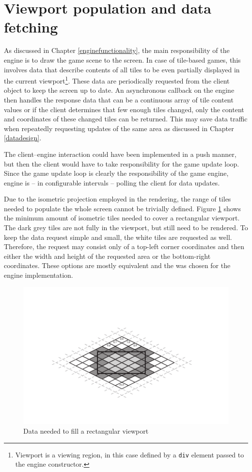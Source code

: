 \documentclass[11pt,oneside, final]{fithesis2}
\begin{document}
\section{Viewport population and data fetching}
As discussed in Chapter \ref{enginefunctionality}, the main responsibility of the engine is to draw the game scene to the screen. In case of tile-based games, this involves data that describe contents of all tiles to be even partially displayed in the current viewport\footnote{Viewport is a viewing region, in this case defined by a \texttt{div} element passed to the engine constructor.}. These data are periodically requested from the client object to keep the screen up to date. An asynchronous callback on the engine then handles the response data that can be a continuous array of tile content values or if the client determines that few enough tiles changed, only the content and coordinates of these changed tiles can be returned. This may save data traffic when repeatedly requesting updates of the same area as discussed in Chapter \ref{datadesign}.

The client--engine interaction could have been implemented in a push manner, but then the client would have to take responsibility for the game update loop. Since the game update loop is clearly the responsibility of the game engine\cite{gregory}, engine is -- in configurable intervals -- polling the client for data updates.

Due to the isometric projection employed in the rendering, the range of tiles needed to populate the whole screen cannot be trivially defined. Figure \ref{isodata} shows the minimum amount of isometric tiles needed to cover a rectangular viewport. The dark grey tiles are not fully in the viewport, but still need to be rendered. To keep the data request simple and small, the white tiles are requested as well. Therefore, the request may consist only of a top-left corner coordinates and then either the width and height of the requested area or the bottom-right coordinates. These options are mostly equivalent and the was chosen for the engine implementation.

\begin{figure}[h]
	\centering
	\includegraphics[clip=true,trim=20mm 17mm 20mm 23mm]{thesis-isodata}
	\caption{Data needed to fill a rectangular viewport}
	\label{isodata}
\end{figure}
\end{document}
